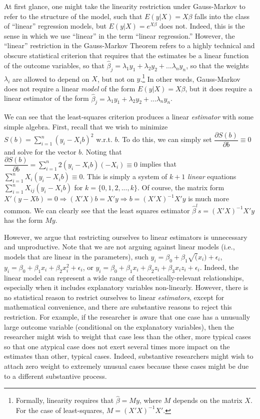 \documentclass[12pt]{article}
\begin{document}
At first glance, one might take the linearity restriction under Gauss-Markov to refer to the structure of the model, such that $E(y | X) = X\beta$ falls into the class of ``linear'' regression models, but  $E(y | X) = e^{X\beta}$ does not. Indeed, this is the sense in which we use ``linear'' in the term ``linear regression.'' However, the ``linear'' restriction in the Gauss-Markov Theorem refers to a highly technical and obscure statistical criterion that requires that the estimates be a linear function of the outcome variables, so that $\hat{\beta}_j = \lambda_1 y_1 + \lambda_2 y_2 + ... \lambda_n y_n$, so that the weights $\lambda_i$ are allowed to depend on $X$, but not on $y$.\footnote{Formally, linearity requires that $\hat{\beta} = My$, where $M$ depends on the matrix $X$. For the case of least-squares, $M = (X'X)^{-1}X'$.} In other words, Gauss-Markov does not require a linear \textit{model} of the form $E(y | X) = X\beta$, but it does require a linear estimator of the form $\hat{\beta}_j = \lambda_1 y_1 + \lambda_2 y_2 + ... \lambda_n y_n$. 

We can see that the least-squares criterion produces a linear \textit{estimator} with some simple algebra. First, recall that we wish to minimize $S(b) = \sum_{i = 1}^n(y_i - X_ib)^2$ w.r.t. $b$. To do this, we can simply set $\dfrac{\partial S(b)}{\partial b} \equiv 0$ and solve for the vector $b$. Noting that $\dfrac{\partial S(b)}{\partial b} = \sum_{i = 1}^n 2(y_i - X_ib)(-X_i) \equiv 0$ implies that $\sum_{i = 1}^n X_i(y_i - X_ib) \equiv 0$. This is simply a system of $k+1$ \textit{linear} equations $\sum_{i = 1}^n X_{ij}(y_i - X_ib)$ for $k = \{0, 1, 2,..., k\}$. Of course, the matrix form $X'(y - Xb) = 0 \Rightarrow (X'X)b = X'y \Rightarrow b = (X'X)^{-1}X'y$ is much more common. We can clearly see that the least squares estimator $\hat{\beta}^ls = (X'X)^{-1}X'y$ has the form $My$.

However, we argue that restricting ourselves to linear estimators is unnecessary and unproductive. Note that we are not arguing against linear models (i.e., models that are linear in the parameters), such $y_i = \beta_0 + \beta_1\sqrt(x_i) + \epsilon_i$, $y_i = \beta_0 + \beta_1x_i + \beta_2x_i^2 + \epsilon_i$,  or $y_i = \beta_0 + \beta_1x_i + \beta_2z_i + \beta_3x_iz_i + \epsilon_i$. Indeed, the linear model can represent a wide range of theoretically-relevant relationships, especially when it includes explanatory variables non-linearly. However, there is no statistical reason to restrict ourselves to linear \textit{estimators}, except for mathematical convenience, and there are substantive reasons to reject this restriction. For example, if the researcher is aware that one case has a unusually large outcome variable (conditional on the explanatory variables), then the researcher might wish to weight that case less than the other, more typical cases so that one atypical case does not exert several times more impact on the estimates than other, typical cases. Indeed, substantive researchers might wish to attach zero weight to extremely unusual cases because these cases might be due to a different substantive process.
\end{document}
